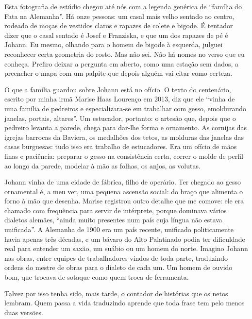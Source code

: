 \documentclass[
  brazilian,
  11pt,
  openany]{book}
\begin{document}
Esta fotografia de estúdio chegou até nós com a legenda genérica de
``família do Fata na Alemanha''. Há onze pessoas: um casal mais velho
sentado ao centro, rodeado de moças de vestidos claros e rapazes de
colete e bigode. É tentador dizer que o casal sentado é Josef e
Franziska, e que um dos rapazes de pé é Johann. Eu mesmo, olhando para o
homem de bigode à esquerda, julguei reconhecer certa geometria do rosto.
Mas não sei. Não há nomes no verso que eu conheça. Prefiro deixar a
pergunta em aberto, como uma estação sem dados, a preencher o mapa com
um palpite que depois alguém vai citar como certeza.

O que a família guardou sobre Johann está no ofício. O texto do
centenário, escrito por minha irmã Marise Haas Lourenço em 2013, diz que
ele ``vinha de uma família de pedreiros e especializara-se em trabalhar
com gesso, emoldurando janelas, portais, altares''. Um estucador,
portanto: o artesão que, depois que o pedreiro levanta a parede, chega
para dar-lhe forma e ornamento. As cornijas das igrejas barrocas da
Baviera, os medalhões dos tetos, as molduras das janelas das casas
burguesas: tudo isso era trabalho de estucadores. Era um ofício de mãos
finas e paciência: preparar o gesso na consistência certa, correr o
molde de perfil ao longo da parede, modelar à mão as folhas, os anjos,
as volutas.

Johann vinha de uma cidade de fábrica, filho de operário. Ter chegado ao
gesso ornamental é, a meu ver, uma pequena ascensão social: do braço que
alimenta o forno à mão que desenha. Marise registrou outro detalhe que
me comove: ele era chamado com frequência para servir de intérprete,
porque dominava vários dialetos alemães, ``ainda muito presentes num
país cuja língua não estava unificada''. A Alemanha de 1900 era um país
recente, unificado politicamente havia apenas três décadas, e um bávaro
do Alto Palatinado podia ter dificuldade real para entender um saxão, um
suábio ou um homem do norte. Imagino Johann nas obras, entre equipes de
trabalhadores vindos de toda parte, traduzindo ordens do mestre de obras
para o dialeto de cada um. Um homem de ouvido bom, que trocava de
sotaque como quem troca de ferramenta.

Talvez por isso tenha sido, mais tarde, o contador de histórias que os
netos lembram. Quem passa a vida traduzindo aprende que toda frase tem
pelo menos duas versões.
\end{document}
